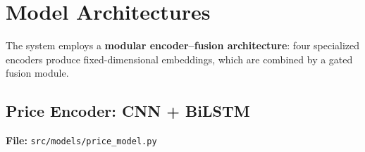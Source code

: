 \documentclass[12pt, a4paper]{article}
\begin{document}
\section{Model Architectures}

The system employs a \textbf{modular encoder--fusion architecture}: four specialized encoders produce fixed-dimensional embeddings, which are combined by a gated fusion module.

\begin{figure}[H]
\centering
{}
\end{figure}


\subsection{Price Encoder: CNN + BiLSTM}
\label{sec:price-model}

\noindent\textbf{File:} \texttt{src/models/price\_model.py}
\end{document}
